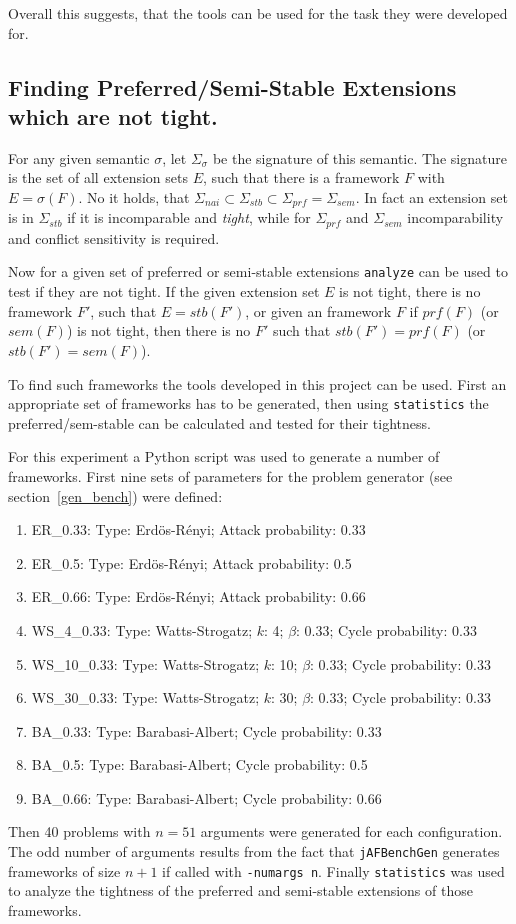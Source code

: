 \documentclass[parskip=half]{scrartcl}
\begin{document}
Overall this suggests, that the tools can be used for the task they were
developed for.

\subsection{Finding Preferred/Semi-Stable Extensions which are not tight.}

For any given semantic $\sigma$, let $\Sigma_{\sigma}$ be the signature of this
semantic. The signature is the set of all extension sets $E$, such that there is a
framework $F$ with $E=\sigma(F)$. No it holds, that $\Sigma_{nai}\subset
\Sigma_{stb}\subset\Sigma_{prf}=\Sigma_{sem}$. In fact an extension set is in $\Sigma_{stb}$
if it is incomparable and \emph{tight}, while for $\Sigma_{prf}$ and $\Sigma_{sem}$
incomparability and conflict sensitivity is required.

Now for a given set of preferred or semi-stable extensions \texttt{analyze} can be used
to test if they are not tight. If the given extension set $E$ is not tight, there is
no framework $F'$, such that $E=stb(F')$, or given an framework $F$ if $prf(F)$ (or $sem(F)$)
is not tight, then there is no $F'$ such that $stb(F')=prf(F)$ (or $stb(F')=sem(F)$).

To find such frameworks the tools developed in this project can be used. First an
appropriate set of frameworks has to be generated, then using \texttt{statistics} the
preferred/sem-stable can be calculated and tested for their tightness.

For this experiment a Python script was used to generate a number of frameworks.
First nine sets of parameters for the problem generator (see section~\ref{gen_bench}) were defined:
\begin{enumerate}
  \item ER\_0.33: Type: Erdös-Rényi; Attack probability: 0.33
  \item ER\_0.5: Type: Erdös-Rényi; Attack probability: 0.5
  \item ER\_0.66: Type: Erdös-Rényi; Attack probability: 0.66
  \item WS\_4\_0.33: Type: Watts-Strogatz; $k$: 4; $\beta$: 0.33; Cycle probability: 0.33
  \item WS\_10\_0.33: Type: Watts-Strogatz; $k$: 10; $\beta$: 0.33; Cycle probability: 0.33
  \item WS\_30\_0.33: Type: Watts-Strogatz; $k$: 30; $\beta$: 0.33; Cycle probability: 0.33
  \item BA\_0.33: Type: Barabasi-Albert; Cycle probability: 0.33
  \item BA\_0.5: Type: Barabasi-Albert; Cycle probability: 0.5
  \item BA\_0.66: Type: Barabasi-Albert; Cycle probability: 0.66
\end{enumerate}
Then 40 problems with $n=51$ arguments were generated for each configuration.
The odd number of arguments results from the fact that \texttt{jAFBenchGen}
generates frameworks of size $n+1$ if called with \texttt{-numargs n}.
Finally \texttt{statistics} was used to analyze the tightness of the preferred and
semi-stable extensions of those frameworks.
\end{document}
